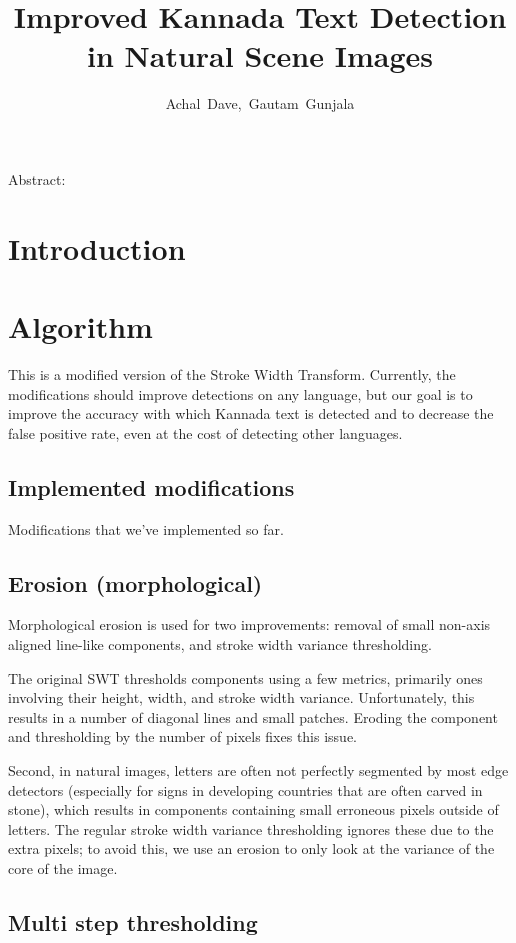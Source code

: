 \documentclass[11pt,twocolumn]{article}
\title{\textbf{Improved Kannada Text Detection\\ in Natural Scene Images}}
\author{Achal~Dave,~Gautam~Gunjala}
\date{}
\begin{document}
\maketitle
Abstract: 

\section{Introduction}

\section{Algorithm}

This is a modified version of the Stroke Width Transform. Currently, the modifications should improve detections on any language, but our goal is to improve the accuracy with which Kannada text is detected and to decrease the false positive rate, even at the cost of detecting other languages.

\subsection{Implemented modifications}

Modifications that we've implemented so far.

\subsection{Erosion (morphological)}

Morphological erosion is used for two improvements: removal of small non-axis aligned line-like components, and stroke width variance thresholding.

The original SWT thresholds components using a few metrics, primarily ones involving their height, width, and stroke width variance. Unfortunately, this results in a number of diagonal lines and small patches. Eroding the component and thresholding by the number of pixels fixes this issue.

Second, in natural images, letters are often not perfectly segmented by most edge detectors (especially for signs in developing countries that are often carved in stone), which results in components containing small erroneous pixels outside of letters. The regular stroke width variance thresholding ignores these due to the extra pixels; to avoid this, we use an erosion to only look at the variance of the core of the image.

\subsection{Multi step thresholding}
\end{document}
